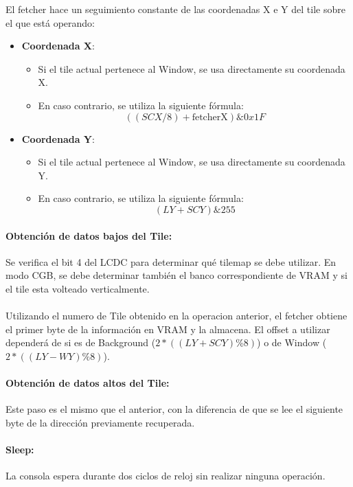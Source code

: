 El fetcher hace un seguimiento constante de las coordenadas X e Y del tile sobre el que está operando:

\begin{itemize}
    \item \textbf{Coordenada X}:
    \begin{itemize}
        \item Si el tile actual pertenece al Window, se usa directamente su coordenada X.
        \item En caso contrario, se utiliza la siguiente fórmula:
        \[
            ((SCX / 8) + \text{fetcherX}) \& 0x1F
        \]
    \end{itemize}
    \item \textbf{Coordenada Y}:
    \begin{itemize}
        \item Si el tile actual pertenece al Window, se usa directamente su coordenada Y.
        \item En caso contrario, se utiliza la siguiente fórmula:
        \[
            (LY + SCY) \& 255
        \]
    \end{itemize}
\end{itemize}

\paragraph{Obtención de datos bajos del Tile:} Se verifica el bit 4 del LCDC para determinar qué tilemap se debe utilizar. En modo CGB, se debe determinar también el banco correspondiente de VRAM y si el tile esta volteado verticalmente.
\\\\
Utilizando el numero de Tile obtenido en la operacion anterior, el fetcher obtiene el primer byte de la información en VRAM y la almacena. El offset a utilizar dependerá de si es de Background ($2*((LY + SCY) \% 8)$) o de Window ($2*((LY - WY) \% 8)$).

\paragraph{Obtención de datos altos del Tile:} Este paso es el mismo que el anterior, con la diferencia de que se lee el siguiente byte de la dirección previamente recuperada.

\paragraph{Sleep:} La consola espera durante dos ciclos de reloj sin realizar ninguna operación.


